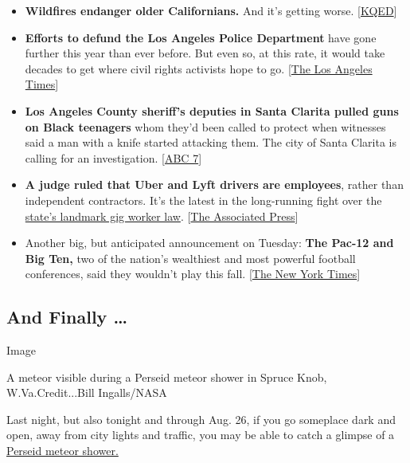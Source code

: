 \begin{itemize}
\item
  \textbf{Wildfires endanger older Californians.} And it's getting
  worse.
  {[}\href{https://data.kqed.org/olderandoverlooked/index.html}{KQED}{]}
\item
  \textbf{Efforts to defund the Los Angeles Police Department} have gone
  further this year than ever before. But even so, at this rate, it
  would take decades to get where civil rights activists hope to go.
  {[}\href{https://www.latimes.com/california/story/2020-08-11/defund-lapd-la-budget-spending-priorities}{The
  Los Angeles Times}{]}
\item
  \textbf{Los Angeles County sheriff's deputies in Santa Clarita pulled
  guns on Black teenagers} whom they'd been called to protect when
  witnesses said a man with a knife started attacking them. The city of
  Santa Clarita is calling for an investigation.
  {[}\href{https://abc7.com/santa-clarita-arrest-teens-sheriffs-deputies-draw-guns/6364515/}{ABC
  7}{]}
\item
  \textbf{A judge ruled that Uber and Lyft drivers are employees},
  rather than independent contractors. It's the latest in the
  long-running fight over the
  \href{https://www.nytimes3xbfgragh.onion/2019/09/11/technology/california-gig-economy-bill.html}{state's
  landmark gig worker law}.
  {[}\href{https://www.nytimes3xbfgragh.onion/aponline/2020/08/10/business/bc-us-california-ride-hailing-lawsuit.html}{The
  Associated Press}{]}
\item
  Another big, but anticipated announcement on Tuesday: \textbf{The
  Pac-12 and Big Ten,} two of the nation's wealthiest and most powerful
  football conferences, said they wouldn't play this fall.
  {[}\href{https://www.nytimes3xbfgragh.onion/2020/08/11/sports/ncaafootball/big-ten-postpones-football-season.html?action=click\&module=Top\%20Stories\&pgtype=Homepage}{The
  New York Times}{]}
\end{itemize}

\hypertarget{and-finally-}{%
\subsection{And Finally \ldots{}}\label{and-finally-}}

Image

A meteor visible during a Perseid meteor shower in Spruce Knob,
W.Va.Credit...Bill Ingalls/NASA

Last night, but also tonight and through Aug. 26, if you go someplace
dark and open, away from city lights and traffic, you may be able to
catch a glimpse of a
\href{https://www.nytimes3xbfgragh.onion/2020/08/11/science/perseid-meteor-shower.html?}{Perseid
meteor shower.}

